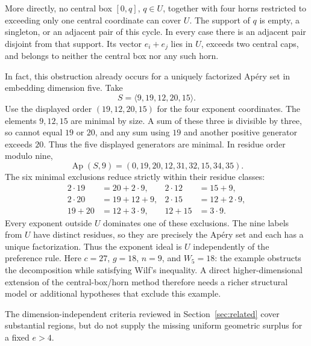 More directly, no central box \([0,q]\), \(q\in U\), together with
four horns restricted to exceeding only one central coordinate can
cover \(U\). The support of \(q\) is empty, a singleton, or an adjacent
pair of this cycle. In every case there is an adjacent pair disjoint
from that support. Its vector \(e_i+e_j\) lies in \(U\), exceeds two
central caps, and belongs to neither the central box nor any such horn.

In fact, this obstruction already occurs for a uniquely factorized Ap\'ery
set in embedding dimension five. Take
\[
S=\langle9,19,12,20,15\rangle.
\]
Use the displayed order \((19,12,20,15)\) for the four exponent coordinates.
The elements \(9,12,15\) are minimal by size. A sum of these three is
divisible by three, so cannot equal \(19\) or \(20\), and any sum using
\(19\) and another positive generator exceeds \(20\). Thus the five displayed
generators are minimal. In residue order modulo nine,
\[
\operatorname{Ap}(S,9)=(0,19,20,12,31,32,15,34,35).
\]
The six minimal exclusions reduce strictly within their residue classes:
\[
\begin{aligned}
2\cdot19&=20+2\cdot9,&2\cdot12&=15+9,\\
2\cdot20&=19+12+9,&2\cdot15&=12+2\cdot9,\\
19+20&=12+3\cdot9,&12+15&=3\cdot9.
\end{aligned}
\]
Every exponent outside \(U\) dominates one of these exclusions. The nine
labels from \(U\) have distinct residues, so they are precisely the Ap\'ery
set and each has a unique factorization. Thus the exponent ideal is \(U\)
independently of the preference rule. Here \(c=27\), \(g=18\), \(n=9\),
and \(W_5=18\): the example obstructs the decomposition while satisfying
Wilf's inequality. A direct higher-dimensional extension of the
central-box/horn method therefore needs a richer structural model or
additional hypotheses that exclude this example.

The dimension-independent criteria reviewed in Section~\ref{sec:related}
cover substantial regions, but do not supply the missing uniform geometric
surplus for a fixed \(e>4\).
